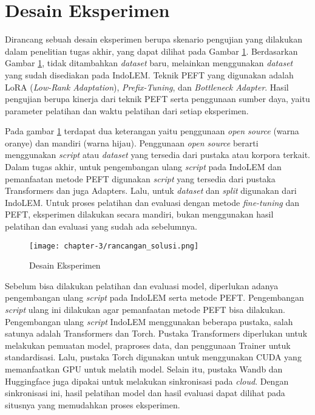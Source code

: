 \section{Desain Eksperimen}
\label{sec:rancangan-solusi}

Dirancang sebuah desain eksperimen berupa skenario pengujian yang dilakukan dalam penelitian tugas akhir, yang dapat dilihat pada Gambar \ref{fig:rancangan-solusi}. Berdasarkan Gambar \ref{fig:rancangan-solusi}, tidak ditambahkan \textit{dataset} baru, melainkan menggunakan \textit{dataset} yang sudah disediakan pada IndoLEM. Teknik PEFT yang digunakan adalah LoRA (\textit{Low-Rank Adaptation}), \textit{Prefix-Tuning}, dan \textit{Bottleneck Adapter}. Hasil pengujian berupa kinerja dari teknik PEFT serta penggunaan sumber daya, yaitu parameter pelatihan dan waktu pelatihan dari setiap eksperimen.

Pada gambar \ref{fig:rancangan-solusi} terdapat dua keterangan yaitu penggunaan \textit{open source} (warna oranye) dan mandiri (warna hijau). Penggunaan \textit{open source} berarti menggunakan \textit{script} atau \textit{dataset} yang tersedia dari pustaka atau korpora terkait. Dalam tugas akhir, untuk pengembangan ulang \textit{script} pada IndoLEM dan pemanfaatan metode PEFT digunakan \textit{script} yang tersedia dari pustaka Transformers dan juga Adapters. Lalu, untuk \textit{dataset} dan \textit{split} digunakan dari IndoLEM. Untuk proses pelatihan dan evaluasi dengan metode \textit{fine-tuning} dan PEFT, eksperimen dilakukan secara mandiri, bukan menggunakan hasil pelatihan dan evaluasi yang sudah ada sebelumnya.

\begin{figure}[ht]
    \centering
    \texttt{[image: chapter-3/rancangan\_solusi.png]}
    \caption{Desain Eksperimen}
    \label{fig:rancangan-solusi}
\end{figure}

Sebelum bisa dilakukan pelatihan dan evaluasi model, diperlukan adanya pengembangan ulang \textit{script} pada IndoLEM serta metode PEFT. Pengembangan \textit{script} ulang ini dilakukan agar pemanfaatan metode PEFT bisa dilakukan. Pengembangan ulang \textit{script} IndoLEM  menggunakan beberapa pustaka, salah satunya adalah Transformers dan Torch. Pustaka Transformers diperlukan untuk melakukan pemuatan model, praproses data, dan penggunaan Trainer untuk standardisasi. Lalu, pustaka Torch digunakan untuk menggunakan CUDA yang memanfaatkan GPU untuk melatih model. Selain itu, pustaka Wandb dan Huggingface juga  dipakai untuk melakukan sinkronisasi pada \textit{cloud}. Dengan sinkronisasi ini, hasil pelatihan model dan hasil evaluasi dapat dilihat pada situsnya yang  memudahkan proses eksperimen. 

